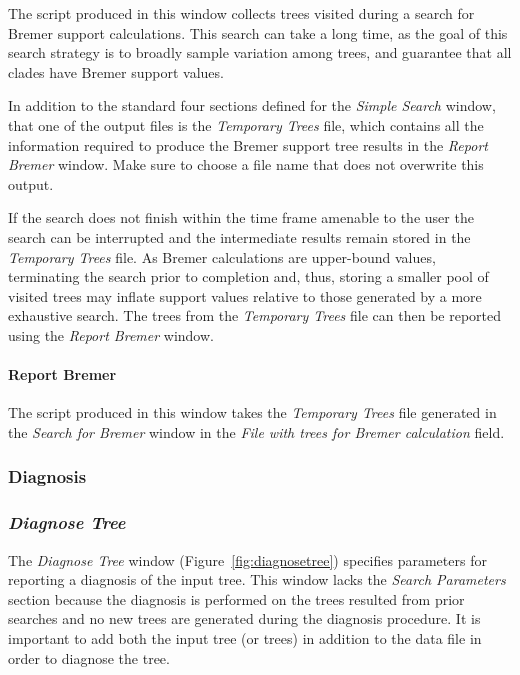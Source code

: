 {The script produced in this window collects trees visited during a search for Bremer support calculations. This
search can take a long time, as the goal of this search strategy is to broadly sample variation among trees, and guarantee that all
clades have Bremer support values.  

In addition to the standard four sections defined for the \emph{Simple Search} window,
 that one of the output files is the \emph{Temporary Trees} file, which 
contains all the information required to produce the Bremer support tree
results in the \emph{Report Bremer} window. Make sure to choose a file name that does not overwrite this output.

If the search does not finish within the time frame amenable to the user the search can be interrupted and the 
intermediate results remain stored in the \emph{Temporary Trees} file.  As Bremer calculations are upper-bound 
values, terminating the search prior to completion and, thus, storing a smaller pool of visited trees may inflate 
support values relative to those generated by a more exhaustive search. The trees from the \emph{Temporary Trees} 
file can then be reported using the \emph{Report Bremer} window.

\paragraph{Report Bremer}
The script produced in this window takes the \emph{Temporary Trees} file generated in the \emph{Search for Bremer} 
window in the \emph{File with trees for Bremer calculation} field. 

\subsubsection{Diagnosis}

\subsubsection*{\emph{Diagnose Tree}}

The \emph{Diagnose Tree} window (Figure~\ref{fig:diagnosetree}) specifies parameters for reporting a diagnosis 
of the input tree. This window lacks the \emph{Search Parameters} section because the diagnosis is performed on 
the trees resulted from prior searches and no new trees are generated during the diagnosis procedure. It is important 
to add both the input tree (or trees) in addition to the data file in order to diagnose the tree.

}
